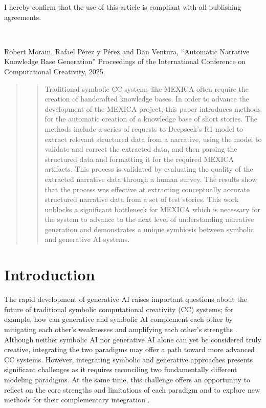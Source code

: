 \documentclass[phd,electronic,oneside,twosidetoc,letterpaper,chaptercenter,parttop,lof]{byumsphd}
\begin{document}
I hereby confirm that the use of this article is compliant with all publishing agreements.

\

\noindent
Robert Morain, Rafael Pérez y Pérez and Dan Ventura, ``Automatic Narrative Knowledge Base Generation'' Proceedings of the International Conference on Computational Creativity, 2025.

\begin{abstract}
\begin{quote}

Traditional symbolic CC systems like MEXICA often require the creation of handcrafted knowledge bases. In order to advance the development of the MEXICA project, this paper introduces methods for the automatic creation of a knowledge base of short stories. The methods include a series of requests to Deepseek's R1 model to extract relevant structured data from a narrative, using the model to validate and correct the extracted data, and then parsing the structured data and formatting it for the required MEXICA artifacts. This process is validated by evaluating the quality of the extracted narrative data through a human survey. The results show that the process was effective at extracting conceptually accurate structured narrative data from a set of test stories. This work unblocks a significant bottleneck for MEXICA which is necessary for the system to advance to the next level of understanding narrative generation and demonstrates a unique symbiosis between symbolic and generative AI systems.

\end{quote}
\end{abstract}

\section{Introduction}
The rapid development of generative AI raises important questions about the future of traditional symbolic computational creativity (CC) systems; for example, how can generative and symbolic AI complement each other by mitigating each other's weaknesses and amplifying each other's strengths \cite{veale2024symbolic}. Although neither symbolic AI nor generative AI alone can yet be considered truly creative, integrating the two paradigms may offer a path toward more advanced CC systems.  However, integrating symbolic and generative approaches presents significant challenges as it requires reconciling two fundamentally different modeling paradigms. At the same time, this challenge offers an opportunity to reflect on the core strengths and limitations of each paradigm and to explore new methods for their complementary integration \cite{perez2023narrative}.
\end{document}
